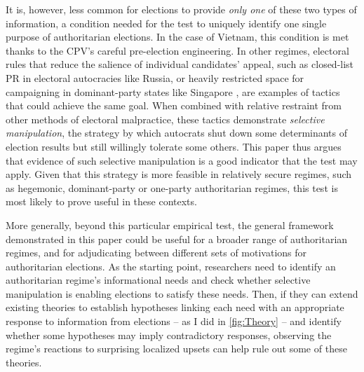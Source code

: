 \documentclass[12pt]{article}
\newcommand{\1}{\mathbbm{1}}
\begin{document}
It is, however, less common for elections to provide \textit{only one} of these two types of information, a condition needed for the test to uniquely identify one single purpose of authoritarian elections. In the case of Vietnam, this condition is met thanks to the CPV's careful pre-election engineering. In other regimes, electoral rules that reduce the salience of individual candidates' appeal, such as closed-list PR in electoral autocracies like Russia, or heavily restricted space for campaigning in dominant-party states like Singapore \citep{Tan2013}, are examples of tactics that could achieve the same goal. When combined with relative restraint from other methods of electoral malpractice, these tactics demonstrate \textit{selective manipulation}, the strategy by which autocrats shut down some determinants of election results but still willingly tolerate some others. This paper thus argues that evidence of such selective manipulation is a good indicator that the test may apply. Given that this strategy is more feasible in relatively secure regimes, such as hegemonic, dominant-party or one-party authoritarian regimes, this test is most likely to prove useful in these contexts.

More generally, beyond this particular empirical test, the general framework demonstrated in this paper could be useful for a broader range of authoritarian regimes, and for adjudicating between different sets of motivations for authoritarian elections. As the starting point, researchers need to identify an authoritarian regime's informational needs and check whether selective manipulation is enabling elections to satisfy these needs. Then, if they can extend existing theories to establish hypotheses linking each need with an appropriate response to information from elections -- as I did in \autoref{fig:Theory} -- and identify whether some hypotheses may imply contradictory responses, observing the regime's reactions to surprising localized upsets can help rule out some of these theories. 
\end{document}
